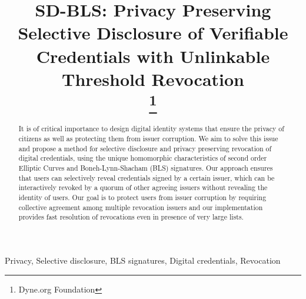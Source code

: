 \documentclass[conference]{IEEEtran}
\begin{document}
\title{SD-BLS: Privacy Preserving Selective Disclosure of Verifiable Credentials with Unlinkable Threshold Revocation\\
\thanks{Dyne.org Foundation}
}

\author{
\and
{}
\and
{}
\and
{}
}

\maketitle

\begin{abstract}
It is of critical importance to design digital identity systems that ensure the privacy of citizens as well as protecting them from issuer corruption. We aim to solve this issue and propose a method for selective disclosure and privacy preserving revocation of digital credentials, using the unique homomorphic characteristics of second order Elliptic Curves and Boneh-Lynn-Shacham (BLS) signatures. Our approach ensures that users can selectively reveal credentials signed by a certain issuer, which can be interactively revoked by a quorum of other agreeing issuers without revealing the identity of users. Our goal is to protect users from issuer corruption by requiring collective agreement among multiple revocation issuers and our implementation provides fast resolution of revocations even in presence of very large lists.
\end{abstract}

\begin{IEEEkeywords}
Privacy, Selective disclosure, BLS signatures, Digital credentials, Revocation
\end{IEEEkeywords}
\end{document}
